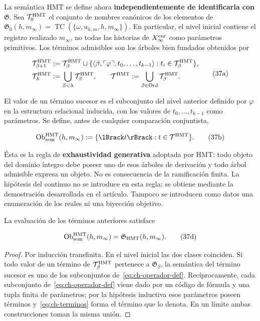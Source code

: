 La semántica HMT se define ahora \textbf{independientemente de identificarla con \(\mathfrak G\)}. Sea \(\mathcal T_0^{\rm HMT}\) el conjunto de nombres
canónicos de los elementos de
\(\mathfrak G_0(h,m_\infty)=
\operatorname{TC}(\{\omega,u_{h,m},h,m_\infty\})\). En particular, el nivel
inicial contiene el registro realizado \(m_\infty\), no todas las historias de
\(X_\infty^{\rm enr}\) como parámetros primitivos.
Los términos admisibles son los árboles bien fundados obtenidos por

\[
 \begin{aligned}
 \mathcal T^{\rm HMT}_{\beta+1}
 &:={\mathcal T}^{\rm HMT}_\beta\cup
 \{\langle\beta,\ulcorner\varphi\urcorner,
       t_0,\ldots,t_{k-1}\rangle:
       t_i\in\mathcal T^{\rm HMT}_\beta\},\\
 \mathcal T^{\rm HMT}_\lambda&:=
       \bigcup_{\beta<\lambda}\mathcal T^{\rm HMT}_\beta,
 \qquad
 \mathcal T^{\rm HMT}:=
       \bigcup_{\beta\in\operatorname{Ord}}\mathcal T^{\rm HMT}_\beta.
 \end{aligned}
\tag{37a}\label{eq:ch-terminos}
\]

El valor de un término sucesor es el subconjunto del nivel anterior definido
por \(\varphi\) en la estructura relacional inducida, con los valores de
\(t_0,\ldots,t_{k-1}\) como parámetros. Se define, antes de cualquier
comparación conjuntista,

\[
 \operatorname{Ob}_{\rm sem}^{\rm HMT}(h,m_\infty)
 :=\{\llbracket t\rrbracket:t\in\mathcal T^{\rm HMT}\}.
\tag{37b}\label{eq:ch-objetos-semanticos}
\]

Ésta es la regla de \textbf{exhaustividad generativa} adoptada por HMT: todo
objeto del dominio íntegro debe poseer uno de esos árboles de derivación y todo
árbol admisible expresa un objeto. No es consecuencia de la ramificación
finita. La hipótesis del continuo no se introduce en esta regla; se obtiene
mediante la demostración desarrollada en el artículo. Tampoco se introducen
como datos una enumeración de los reales ni una biyección objetivo.

\begin{theorem}
\label{thm:ch-6a}
La evaluación de
los términos anteriores satisface

\[
 \operatorname{Ob}_{\rm sem}^{\rm HMT}(h,m_\infty)
 =\mathfrak G_{\rm HMT}(h,m_\infty).
\tag{37d}\label{eq:ch-equivalencia-semantica}
\]

\end{theorem}
\begin{proof}
Por inducción transfinita. En el nivel inicial las dos clases
coinciden. Si todo valor de un término de
\(\mathcal T^{\rm HMT}_\beta\) pertenece a
\(\mathfrak G_\beta\), la semántica del término sucesor es uno de los
subconjuntos de~\eqref{eq:ch-operador-def}. Recíprocamente, cada subconjunto de~\eqref{eq:ch-operador-def} viene dado por
un código de fórmula y una tupla finita de parámetros; por la hipótesis
inductiva esos parámetros poseen términos y~\eqref{eq:ch-terminos} forma el término que lo
denota. En un límite ambas construcciones toman la misma unión.
\end{proof}

